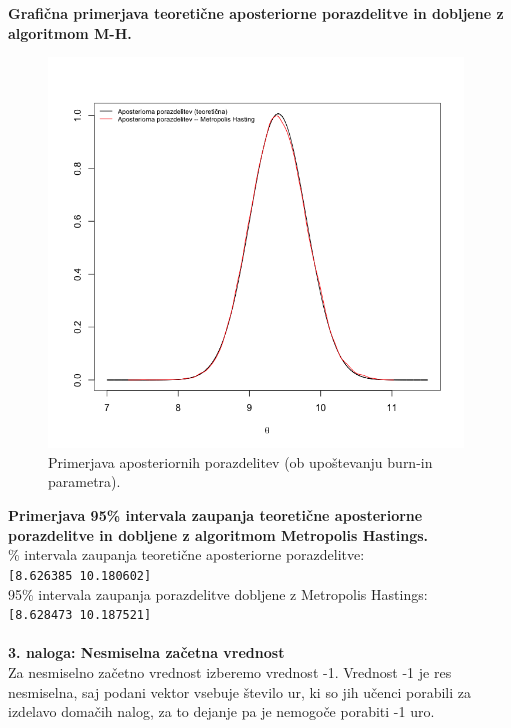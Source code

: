 \documentclass[a4paper,11pt]{article}
\begin{document}
\noindent
\textbf{Grafična primerjava teoretične aposteriorne porazdelitve in dobljene z algoritmom M-H.}
    \begin{figure}[ht!]
            \centering
            \includegraphics[width = 110mm]{Slike/2_4a.png}
            \caption{Primerjava aposteriornih porazdelitev (ob upoštevanju burn-in parametra).}
    \end{figure}

\newpage
\noindent
\textbf{Primerjava 95\% intervala zaupanja teoretične aposteriorne porazdelitve in dobljene z algoritmom Metropolis Hastings.}
\\
\% intervala zaupanja teoretične aposteriorne porazdelitve: 
\\
\texttt{[8.626385     10.180602]}
\\[0.1cm]
95\% intervala zaupanja porazdelitve dobljene z Metropolis Hastings:
\\
\texttt{[8.628473    10.187521]}
\\
\\
\noindent
\textbf{3. naloga: Nesmiselna začetna vrednost}
\\
Za nesmiselno začetno vrednost izberemo vrednost -1. Vrednost -1 je res nesmiselna, saj podani vektor vsebuje število ur, ki so jih učenci porabili za izdelavo domačih nalog, za to dejanje pa je nemogoče porabiti -1 uro.
\end{document}
